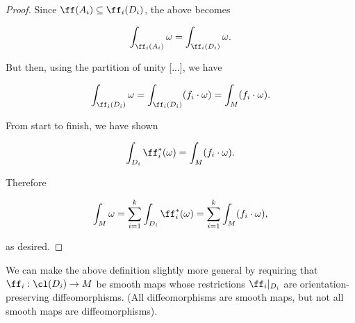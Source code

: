 \begin{proof}
    Since $\ff(A_i) \subseteq \ff_i(D_i)$, the above becomes
    
    \begin{align*}
        \int_{\ff_i(A_i)} \omega = \int_{\ff_i(D_i)} \omega.
    \end{align*}
    
    But then, using the partition of unity [...], we have
    
    \begin{align*}
        \int_{\ff_i(D_i)} \omega = \int_{\ff_i(D_i)} (f_i \cdot \omega) = \int_M (f_i \cdot \omega).
    \end{align*}
    
    From start to finish, we have shown
    
    \begin{align*}
        \int_{D_i} \ff_i^*(\omega) = \int_M (f_i \cdot \omega).
    \end{align*}
    
    Therefore 
    
    \begin{align*}
        \int_M \omega = \sum_{i = 1}^k \int_{D_i} \ff_i^*(\omega) = \sum_{i = 1}^k \int_M (f_i \cdot \omega),
    \end{align*}
    
    as desired.

    
    
\end{proof}

\begin{remark}
    We can make the above definition slightly more general by requiring that $\ff_i:\cl(D_i) \rightarrow M$ be smooth maps whose restrictions $\ff_i|_{D_i}$ are orientation-preserving diffeomorphisms. (All diffeomorphisms are smooth maps, but not all smooth maps are diffeomorphisms).
\end{remark}

